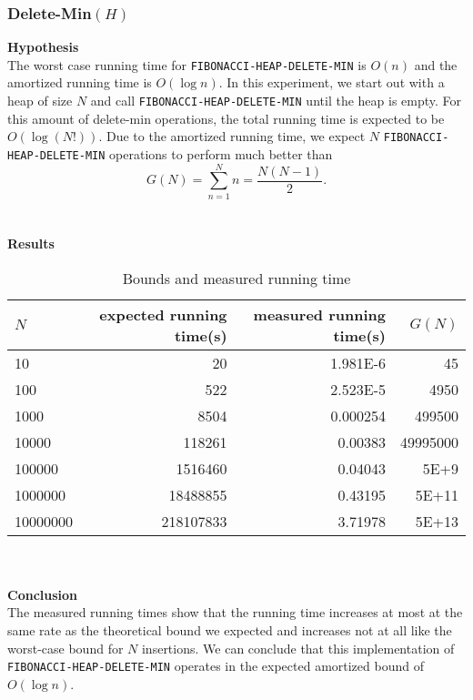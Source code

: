 \documentclass[a4paper,10pt]{article}
\begin{document}
\subsubsection{Delete-Min$(H)$}
{\bf Hypothesis}\\
The worst case running time for \texttt{FIBONACCI-HEAP-DELETE-MIN} is $O(n)$ and the amortized running time is $O(\log n)$. In this experiment, we start out with a heap of size $N$ and call \texttt{FIBONACCI-HEAP-DELETE-MIN} until the heap is empty. For this amount of delete-min operations, the total running time is expected to be $O(\log(N!))$. Due to the amortized running time, we expect $N$ \texttt{FIBONACCI-HEAP-DELETE-MIN} operations to perform much better than \[G(N) = \sum^N_{n=1} n = \frac{N(N-1)}{2}.\]\\\\
{\bf Results}\\
\begin{table}
  \begin{center}
    \begin{tabular}{l|r|r|r}
      $N$ & expected running time(s) & measured running time(s) & $G(N)$\\
      \hline
      10       & \num{20}           & \num{1.981E-6} & \num{45}\\ 
      100      & \num{522}          & \num{2.523E-5} & \num{4950}\\
      1000     & \num{8504}         & \num{0.000254} & \num{499500}\\
      10000    & \num{118261}       & \num{0.00383}  & \num{49995000}\\
      100000   & \num{1516460}      & \num{0.04043}  & \num{5E+9}\\
      1000000  & \num{18488855}     & \num{0.43195}  & \num{5E+11}\\
      10000000 & \num{218107833}    & \num{3.71978}  & \num{5E+13}
    \end{tabular}
    \caption{Bounds and measured running time}
  \end{center}
\end{table}\\\\
{\bf Conclusion}\\
The measured running times show that the running time increases at most at the same rate as the theoretical bound we expected and increases not at all like the worst-case bound for $N$ insertions. We can conclude that this implementation of \texttt{FIBONACCI-HEAP-DELETE-MIN} operates in the expected amortized bound of $O(\log n)$.
\end{document}

